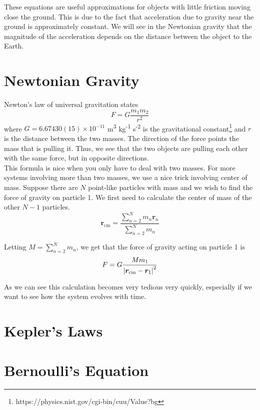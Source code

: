 \documentclass[oneside]{book}
\numberwithin{figure}{section}
\numberwithin{equation}{section}
\theoremstyle{definition}
\begin{document}
	These equations are useful approximations for objects with little friction moving close the ground. This is due to the fact that acceleration due to gravity near the ground is approximately constant. We will see in the Newtonian gravity that the magnitude of the acceleration depends on the distance between the object to the Earth.
	
	\section{Newtonian Gravity}
	Newton's law of universal gravitation states
	\begin{equation}
		F = G\dfrac{m_1m_2}{r^2}
	\end{equation}
	where $ G = 6.67430(15) \times 10^{-11} $ m\textsuperscript{3} kg\textsuperscript{-1} s\textsuperscript{-2} is the gravitational constant\footnote{https://physics.nist.gov/cgi-bin/cuu/Value?bg} and $ r $ is the distance between the two masses. The direction of the force points the mass that is pulling it. Thus, we see that the two objects are pulling each other with the same force, but in opposite directions.\\
	
	This formula is nice when you only have to deal with two masses. For more systems involving more than two masses, we use a nice trick involving center of mass. Suppose there are $ N $ point-like particles with mass and we wish to find the force of gravity on particle 1. We first need to calculate the center of mass of the other $ N - 1 $ particles.
	\begin{equation}
		\bm{r}_\text{cm} = \dfrac{\sum_{n = 2}^{N}m_n\bm{r}_n}{\sum_{n = 2}^{N}m_n}
	\end{equation}

	Letting $ M = \sum_{n = 2}^{N}m_n $, we get that the force of gravity acting on particle 1 is
	\begin{equation}
		F = G\dfrac{Mm_1}{\abs{\bm{r}_\text{cm} - \bm{r}_1}^2}
	\end{equation}

	As we can see this calculation becomes very tedious very quickly, especially if we want to see how the system evolves with time.
	
	\section{Kepler's Laws}
	\section{Bernoulli's Equation}
\end{document}
